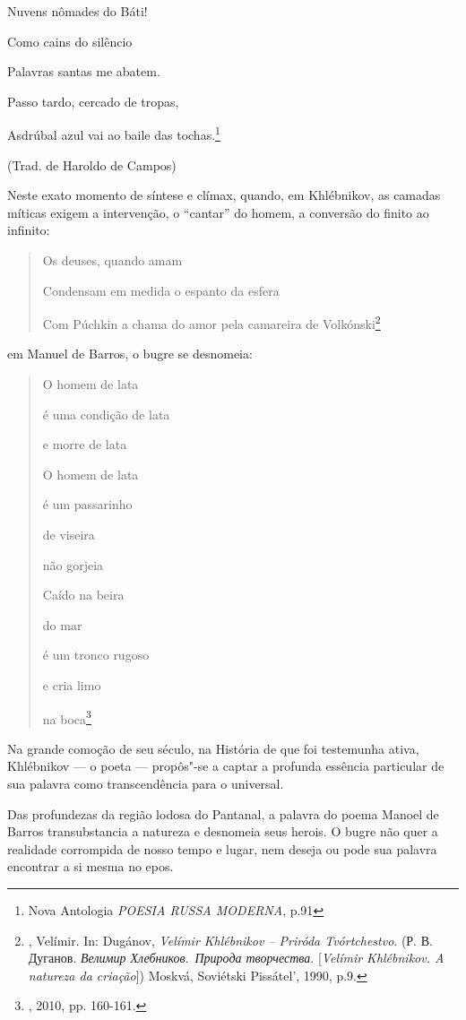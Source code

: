 Nuvens nômades do Báti!

Como cains do silêncio

Palavras santas me abatem.

Passo tardo, cercado de tropas,

Asdrúbal azul vai ao baile das tochas.\footnote{Nova Antologia
  \emph{POESIA RUSSA MODERNA}, p.91}

(Trad. de Haroldo de Campos)

Neste exato momento de síntese e clímax, quando, em Khlébnikov, as
camadas míticas exigem a intervenção, o ``cantar'' do homem, a conversão
do finito ao infinito:

\begin{quote}
Os deuses, quando amam

Condensam em medida o espanto da esfera

Com Púchkin a chama do amor pela camareira de Volkónski\footnote{,
  Velímir. In: Dugánov,  \emph{Velímir Khlébnikov -- Priróda
  Tvórtchestvo}. (Р. В. Дуганов. \emph{Велимир Хлебников}.~\emph{Природа
  творчества}. {[}\emph{Velímir Khlébnikov. A natureza da criação}{]})
  Moskvá, Soviétski Pissátel', 1990, p.9.}
\end{quote}

em Manuel de Barros, o bugre se desnomeia:

\begin{quote}
O homem de lata

é uma condição de lata

e morre de lata

O homem de lata

é um passarinho

de viseira

não gorjeia

Caído na beira

do mar

é um tronco rugoso

e cria limo

na boca\footnote{, 2010, pp. 160-161.}
\end{quote}

Na grande comoção de seu século, na História de que foi testemunha
ativa, Khlébnikov --- o poeta --- propôs"-se a captar a profunda essência
particular de sua palavra como transcendência para o universal.

Das profundezas da região lodosa do Pantanal, a palavra do poema Manoel
de Barros transubstancia a natureza e desnomeia seus herois. O bugre não
quer a realidade corrompida de nosso tempo e lugar, nem deseja ou pode
sua palavra encontrar a si mesma no epos.


